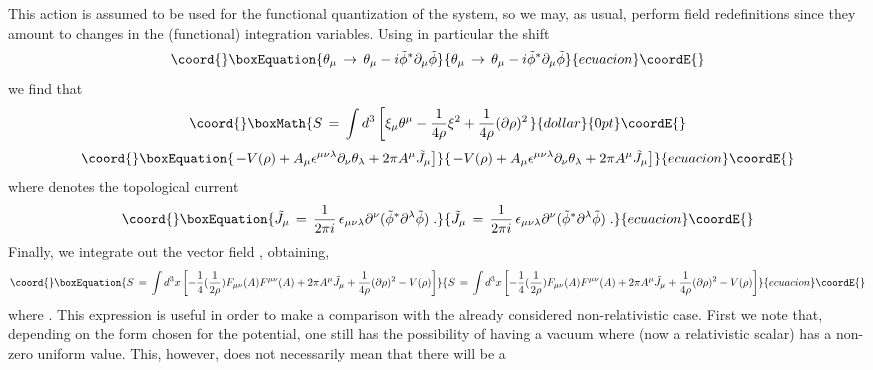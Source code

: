 \documentclass[a4paper,12pt]{article} \tolerance=200
\begin{document}
This action is assumed to be used for the functional quantization of
the system, so we may, as usual, perform field redefinitions since
they amount to changes in the (functional) integration variables.
Using in particular the shift
\begin{equation}\coord{}\boxEquation{
\theta_\mu \,\to \, \theta_\mu - i {\tilde \phi}^* \partial_\mu {\tilde \phi}
}{
\theta_\mu \,\to \, \theta_\mu - i {\tilde \phi}^* \partial_\mu {\tilde \phi}
}{ecuacion}\coordE{}\end{equation}
we find that
$$\coord{}\boxMath{
S\,=\, \int d^3 \left[ \xi_\mu \theta^\mu - \frac{1}{4\rho} \xi^2 + \frac{1}{4 \rho} 
(\partial \rho)^2 \right.  
}{dollar}{0pt}\coordE{}$$
\begin{equation}\coord{}\boxEquation{
\left. - V(\rho) + A_\mu \epsilon^{\mu\nu\lambda} \partial_\nu \theta_\lambda + 2 \pi  
A^\mu {\tilde J}_\mu \right]
}{
\left. - V(\rho) + A_\mu \epsilon^{\mu\nu\lambda} \partial_\nu \theta_\lambda + 2 \pi  
A^\mu {\tilde J}_\mu \right]
}{ecuacion}\coordE{}\end{equation}
where \coordHE{} denotes the topological current
\begin{equation}\coord{}\boxEquation{
{\tilde J}_\mu \,=\, \frac{1}{2\pi i} \, \epsilon_{\mu\nu\lambda} \partial^\nu 
({\tilde \phi}^* \partial^\lambda {\tilde \phi}) \;.
}{
{\tilde J}_\mu \,=\, \frac{1}{2\pi i} \, \epsilon_{\mu\nu\lambda} \partial^\nu 
({\tilde \phi}^* \partial^\lambda {\tilde \phi}) \;.
}{ecuacion}\coordE{}\end{equation}
Finally, we integrate out the vector field \myHighlight{$\theta_\mu$}\coordHE{}, obtaining,
\begin{equation}\coord{}\boxEquation{
S\,=\, \int d^3x \left[ -\frac{1}{4} (\frac{1}{2\rho}) F_{\mu\nu}(A) F^{\mu\nu}(A) 
+ 2 \pi A^\mu {\tilde J}_\mu +\frac{1}{4 \rho} (\partial \rho)^2 - V(\rho) \right]
}{
S\,=\, \int d^3x \left[ -\frac{1}{4} (\frac{1}{2\rho}) F_{\mu\nu}(A) F^{\mu\nu}(A) 
+ 2 \pi A^\mu {\tilde J}_\mu +\frac{1}{4 \rho} (\partial \rho)^2 - V(\rho) \right]
}{ecuacion}\coordE{}\end{equation}
where \coordHE{}.  This expression is useful in
order to make a comparison with the already considered
non-relativistic case. First we note that, depending on the form
chosen for the potential, one still has the possibility of having a
vacuum where \myHighlight{$\rho$}\coordHE{} (now a relativistic scalar) has a non-zero uniform
value.  This, however, does not necessarily mean that there will be a
\end{document}
